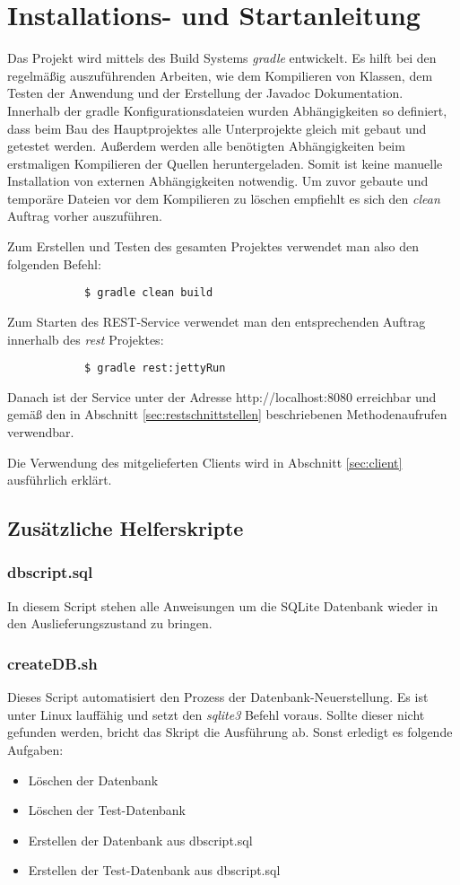 \documentclass[12pt]{scrartcl}
\begin{document}
	\section{Installations- und Startanleitung}
		Das Projekt wird mittels des Build Systems \emph{gradle} entwickelt. Es hilft bei den regelmäßig auszuführenden Arbeiten, wie dem Kompilieren von Klassen, dem Testen der Anwendung und der Erstellung der Javadoc Dokumentation. Innerhalb der gradle Konfigurationsdateien wurden Abhängigkeiten so definiert, dass beim Bau des Hauptprojektes alle Unterprojekte gleich mit gebaut und getestet werden. Außerdem werden alle benötigten Abhängigkeiten beim erstmaligen Kompilieren der Quellen heruntergeladen. Somit ist keine manuelle Installation von externen Abhängigkeiten notwendig. Um zuvor gebaute und temporäre Dateien vor dem Kompilieren zu löschen empfiehlt es sich den \emph{clean} Auftrag vorher auszuführen.
				
		Zum Erstellen und Testen des gesamten Projektes verwendet man also den folgenden Befehl:
		\begin{verbatim}
			$ gradle clean build
		\end{verbatim}
		
		Zum Starten des REST-Service verwendet man den entsprechenden Auftrag innerhalb des \emph{rest} Projektes:
		\begin{verbatim}
			$ gradle rest:jettyRun
		\end{verbatim}
		
		Danach ist der Service unter der Adresse http://localhost:8080 erreichbar und gemäß den in Abschnitt \ref{sec:restschnittstellen} beschriebenen Methodenaufrufen verwendbar.
		
		Die Verwendung des mitgelieferten Clients wird in Abschnitt \ref{sec:client} ausführlich erklärt.
		
		\subsection{Zusätzliche Helferskripte}
			\subsubsection{dbscript.sql}
				In diesem Script stehen alle Anweisungen um die SQLite Datenbank wieder in den Auslieferungszustand zu bringen.
			\subsubsection{createDB.sh}
				Dieses Script automatisiert den Prozess der Datenbank-Neuerstellung. Es ist unter Linux lauffähig und setzt den \emph{sqlite3} Befehl voraus. Sollte dieser nicht gefunden werden, bricht das Skript die Ausführung ab.
				Sonst erledigt es folgende Aufgaben:
				\begin{itemize}
					\item Löschen der Datenbank
					\item Löschen der Test-Datenbank
					\item Erstellen der Datenbank aus dbscript.sql
					\item Erstellen der Test-Datenbank aus dbscript.sql
				\end{itemize}
\end{document}
